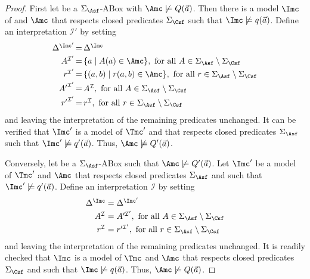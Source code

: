 \documentclass{lmcs}
\theoremstyle{definition}
\newcommand{\sigmaabox}{\Sigma_\Asf}
\newcommand{\sigmaclosed}{\Sigma_\Csf}
\begin{document}
\begin{proof}
  \smallskip

  First let \Amc be a $\sigmaabox$-ABox with $\Amc\not\models Q(\vec{a})$. Then there is
  a model $\Imc$ of \Tmc and $\Amc$ that respects closed predicates
  $\sigmaclosed$ such that $\Imc\not\models q(\vec{a})$.  Define
  an interpretation $\mathcal{I}'$ by setting
%
$$
\begin{array}{r@{\,}c@{\,}l}
  \Delta^{\Imc'} &=& \Delta^{\Imc} \\[1mm]
  A^{\mathcal{I}'} &=& \{a \mid A(a)\in \Amc\}, \text { for all } A\in \sigmaabox \setminus \sigmaclosed \\[1mm]
  r^{\mathcal{I}'} &=& \{(a,b) \mid r(a,b)\in \Amc\}, \text{ for all
  } r\in \sigmaabox \setminus \sigmaclosed \\[1mm]
  {A'}^{\mathcal{I}'} &=& A^{\mathcal{I}}, \text{ for all } A\in \sigmaabox\setminus \sigmaclosed\\[1mm]
  {r'}^{\mathcal{I}'} &=& r^{\mathcal{I}}, \text{ for all } r\in \sigmaabox\setminus \sigmaclosed
\end{array}
$$
%
and leaving the interpretation of the remaining predicates unchanged.  It
can be verified that $\Imc'$ is a model of $\Tmc'$ and \Amc that
respects closed predicates $\Sigma_\Asf$ such that
$\Imc'\not\models q'(\vec{a})$. Thus, $\Amc\not\models Q'(\vec{a})$.

\smallskip
\noindent
Conversely, let \Amc be a $\sigmaabox$-ABox such that
$\Amc\not\models Q'(\vec{a})$.  Let $\Imc'$ be
a model of $\Tmc'$ and $\Amc$ that respects closed predicates
$\Sigma_\Asf$ and such that $\Imc'\not\models q'(\vec{a})$.  Define an
interpretation $\mathcal{I}$ by setting
%
$$
\begin{array}{r@{\;}c@{\;}l}
  \Delta^{\Imc} &=& \Delta^{\Imc'} \\[1mm]
  A^{\mathcal{I}} &=& A'^{\mathcal{I}'}, \text{ for all }
  A\in \sigmaabox\setminus \sigmaclosed \\[1mm]
  r^{\mathcal{I}} &=& r'^{\mathcal{I}'}, \text{ for all } r\in \sigmaabox\setminus \sigmaclosed
\end{array}
$$
%
and leaving the interpretation of the remaining predicates unchanged. It 
is readily checked that $\Imc$ is a model of $\Tmc$ and $\Amc$ that 
respects closed predicates $\Sigma_\Csf$ and such that $\Imc\not\models 
q(\vec{a})$. Thus, $\Amc\not\models Q(\vec{a})$.


\end{proof}
\end{document}
